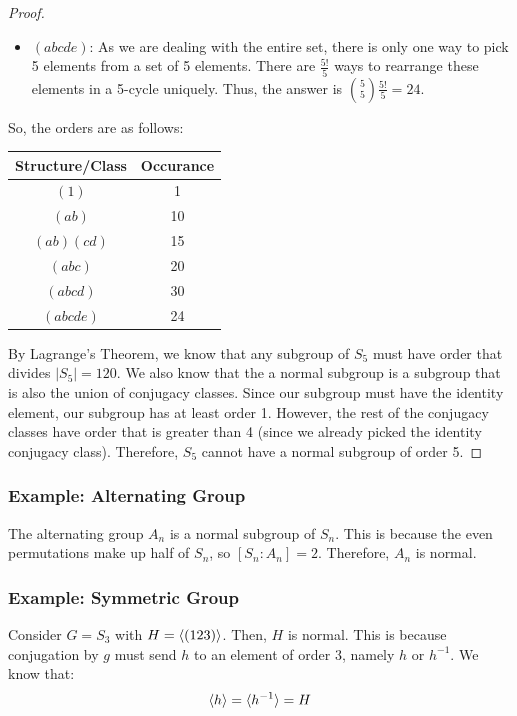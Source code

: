 \documentclass[letterpaper]{article}
\begin{document}
\begin{mdframed}
\begin{proof}
\begin{itemize}
            \item \underline{$(abcde)$}: As we are dealing with the entire set, there is only one way to pick 5 elements from a set of 5 elements. There are $\frac{5!}{5}$ ways to rearrange these elements in a 5-cycle uniquely. Thus, the answer is $\binom{5}{5} \frac{5!}{5} = 24$. 
        \end{itemize}
        So, the orders are as follows: 
        \begin{center}
            \begin{tabular}{c|c}
                \textbf{Structure/Class} & \textbf{Occurance} \\ 
                \hline
                $(1)$ & 1 \\ 
                $(ab)$ & 10 \\ 
                $(ab)(cd)$ & 15 \\ 
                $(abc)$ & 20 \\ 
                $(abcd)$ & 30 \\ 
                $(abcde)$ & 24
            \end{tabular}
        \end{center}
        By Lagrange's Theorem, we know that any subgroup of $S_5$ must have order that divides $|S_5| = 120$. We also know that the a normal subgroup is a subgroup that is also the union of conjugacy classes. Since our subgroup must have the identity element, our subgroup has at least order 1. However, the rest of the conjugacy classes have order that is greater than 4 (since we already picked the identity conjugacy class). Therefore, $S_5$ cannot have a normal subgroup of order 5.  
    \end{proof}    
\end{mdframed}

\subsubsection{Example: Alternating Group}
The alternating group $A_n$ is a normal subgroup of $S_n$. This is because the even permutations make up half of $S_n$, so $[S_n: A_n] = 2$. Therefore, $A_n$ is normal. 


\subsubsection{Example: Symmetric Group}
Consider $G = S_3$ with $H = \langle (123) \rangle$. Then, $H$ is normal. This is because conjugation by $g$ must send $h$ to an element of order 3, namely $h$ or $h^{-1}$. We know that: 
\[\langle h \rangle = \langle h^{-1} \rangle = H\]
\end{document}
